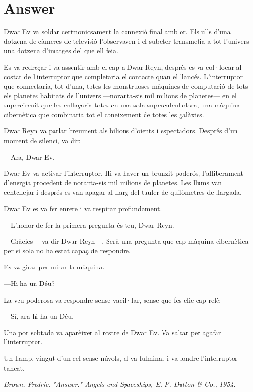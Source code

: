 
\chapter{Answer}




\begin{modernquote}
    Dwar Ev va soldar cerimoniosament la connexió final amb or. Els ulls d’una dotzena de càmeres de televisió l’observaven i el subeter transmetia a tot l’univers una dotzena d’imatges del que ell feia.

Es va redreçar i va assentir amb el cap a Dwar Reyn, després es va col·locar al costat de l’interruptor que completaria el contacte quan el llancés. L’interruptor que connectaria, tot d’una, totes les monstruoses màquines de computació de tots els planetes habitats de l’univers —noranta-sis mil milions de planetes— en el supercircuit que les enllaçaria totes en una sola supercalculadora, una màquina cibernètica que combinaria tot el coneixement de totes les galàxies.

Dwar Reyn va parlar breument als bilions d’oients i espectadors. Després d’un moment de silenci, va dir:

—Ara, Dwar Ev.


Dwar Ev va activar l’interruptor. Hi va haver un brunzit poderós, l’alliberament d’energia procedent de noranta-sis mil milions de planetes. Les llums van centellejar i després es van apagar al llarg del tauler de quilòmetres de llargada.

Dwar Ev es va fer enrere i va respirar profundament.

—L’honor de fer la primera pregunta és teu, Dwar Reyn.



—Gràcies —va dir Dwar Reyn—. Serà una pregunta que cap màquina cibernètica per si sola no ha estat capaç de respondre.


Es va girar per mirar la màquina.

—Hi ha un Déu?


La veu poderosa va respondre sense vacil·lar, sense que fes clic cap relé:

—Sí, ara hi ha un Déu.


Una por sobtada va aparèixer al rostre de Dwar Ev. Va saltar per agafar l’interruptor.

Un llamp, vingut d’un cel sense núvols, el va fulminar i va fondre l’interruptor tancat.


    \hfill\textit{Brown, Fredric. "Answer." Angels and Spaceships, E. P. Dutton & Co., 1954.}
\end{modernquote}


